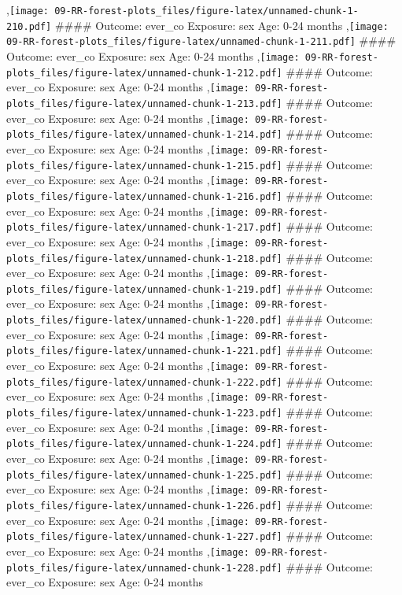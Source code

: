 \documentclass[
  9pt,
]{book}
\begin{document}
,\texttt{[image: 09-RR-forest-plots\_files/figure-latex/unnamed-chunk-1-210.pdf]}
\#\#\#\# Outcome: ever\_co Exposure: sex Age: 0-24 months
,\texttt{[image: 09-RR-forest-plots\_files/figure-latex/unnamed-chunk-1-211.pdf]}
\#\#\#\# Outcome: ever\_co Exposure: sex Age: 0-24 months
,\texttt{[image: 09-RR-forest-plots\_files/figure-latex/unnamed-chunk-1-212.pdf]}
\#\#\#\# Outcome: ever\_co Exposure: sex Age: 0-24 months
,\texttt{[image: 09-RR-forest-plots\_files/figure-latex/unnamed-chunk-1-213.pdf]}
\#\#\#\# Outcome: ever\_co Exposure: sex Age: 0-24 months
,\texttt{[image: 09-RR-forest-plots\_files/figure-latex/unnamed-chunk-1-214.pdf]}
\#\#\#\# Outcome: ever\_co Exposure: sex Age: 0-24 months
,\texttt{[image: 09-RR-forest-plots\_files/figure-latex/unnamed-chunk-1-215.pdf]}
\#\#\#\# Outcome: ever\_co Exposure: sex Age: 0-24 months
,\texttt{[image: 09-RR-forest-plots\_files/figure-latex/unnamed-chunk-1-216.pdf]}
\#\#\#\# Outcome: ever\_co Exposure: sex Age: 0-24 months
,\texttt{[image: 09-RR-forest-plots\_files/figure-latex/unnamed-chunk-1-217.pdf]}
\#\#\#\# Outcome: ever\_co Exposure: sex Age: 0-24 months
,\texttt{[image: 09-RR-forest-plots\_files/figure-latex/unnamed-chunk-1-218.pdf]}
\#\#\#\# Outcome: ever\_co Exposure: sex Age: 0-24 months
,\texttt{[image: 09-RR-forest-plots\_files/figure-latex/unnamed-chunk-1-219.pdf]}
\#\#\#\# Outcome: ever\_co Exposure: sex Age: 0-24 months
,\texttt{[image: 09-RR-forest-plots\_files/figure-latex/unnamed-chunk-1-220.pdf]}
\#\#\#\# Outcome: ever\_co Exposure: sex Age: 0-24 months
,\texttt{[image: 09-RR-forest-plots\_files/figure-latex/unnamed-chunk-1-221.pdf]}
\#\#\#\# Outcome: ever\_co Exposure: sex Age: 0-24 months
,\texttt{[image: 09-RR-forest-plots\_files/figure-latex/unnamed-chunk-1-222.pdf]}
\#\#\#\# Outcome: ever\_co Exposure: sex Age: 0-24 months
,\texttt{[image: 09-RR-forest-plots\_files/figure-latex/unnamed-chunk-1-223.pdf]}
\#\#\#\# Outcome: ever\_co Exposure: sex Age: 0-24 months
,\texttt{[image: 09-RR-forest-plots\_files/figure-latex/unnamed-chunk-1-224.pdf]}
\#\#\#\# Outcome: ever\_co Exposure: sex Age: 0-24 months
,\texttt{[image: 09-RR-forest-plots\_files/figure-latex/unnamed-chunk-1-225.pdf]}
\#\#\#\# Outcome: ever\_co Exposure: sex Age: 0-24 months
,\texttt{[image: 09-RR-forest-plots\_files/figure-latex/unnamed-chunk-1-226.pdf]}
\#\#\#\# Outcome: ever\_co Exposure: sex Age: 0-24 months
,\texttt{[image: 09-RR-forest-plots\_files/figure-latex/unnamed-chunk-1-227.pdf]}
\#\#\#\# Outcome: ever\_co Exposure: sex Age: 0-24 months
,\texttt{[image: 09-RR-forest-plots\_files/figure-latex/unnamed-chunk-1-228.pdf]}
\#\#\#\# Outcome: ever\_co Exposure: sex Age: 0-24 months
\end{document}
